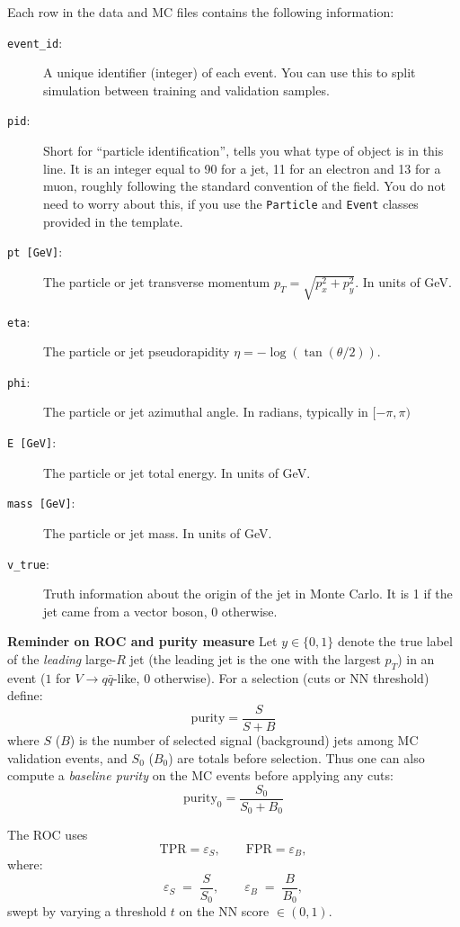 \documentclass[11pt]{article}
\begin{document}
Each row in the data and MC files contains the following information:

\begin{description}
  \item[\texttt{event\_id}:] A unique identifier (integer) of each event. You can use this to split simulation between training and validation samples.
  \item[\texttt{pid}:] Short for ``particle identification'', tells you what type of object is in this line. It is an integer equal to 90 for a jet, 11 for an electron and 13 for a muon, roughly following the standard convention of the field. You do not need to worry about this, if you use the \texttt{Particle} and \texttt{Event} classes provided in the template.
  \item[\texttt{pt [GeV]}:] The particle or jet transverse momentum $p_T = \sqrt{p^2_x + p^2_y}$. In units of GeV.
  \item[\texttt{eta}:] The particle or jet pseudorapidity $\eta = -\log\left(\tan(\theta/2)\right)$.
  \item[\texttt{phi}:] The particle or jet azimuthal angle. In radians, typically in $[-\pi,\pi)$
  \item[\texttt{E [GeV]}:] The particle or jet total energy. In units of GeV.
  \item[\texttt{mass [GeV]}:] The particle or jet mass. In units of GeV.
  \item[\texttt{v\_true}:] Truth information about the origin of the jet in Monte Carlo. It is 1 if the jet came from a vector boson, 0 otherwise.
\end{description}

\vspace{0.75em}
\noindent\textbf{Reminder on ROC and purity measure} Let $y\in\{0,1\}$ denote the true label of the \emph{leading} large-$R$ jet (the leading jet is the one with the largest $p_T$) in an event ($1$ for $V\to q\bar q$-like, $0$ otherwise). For a selection (cuts or NN threshold) define:
\[
\text{purity} = \frac{S}{S+B}
\]
where $S$ ($B$) is the number of selected signal (background) jets among MC validation events, and $S_0$ ($B_0$) are totals before selection. Thus one can also compute a \emph{baseline purity} on the MC events before applying any cuts:
\[
\text{purity}_0 = \frac{S_0}{S_0+B_0}
\]

The ROC uses
\[
\text{TPR}=\varepsilon_S, \qquad \text{FPR}=\varepsilon_B,
\]
where:
\[
  \varepsilon_S \;=\; \frac{S}{S_0},\qquad
  \varepsilon_B \;=\; \frac{B}{B_0},
\]
swept by varying a threshold $t$ on the NN score $\in(0,1)$.
\end{document}
